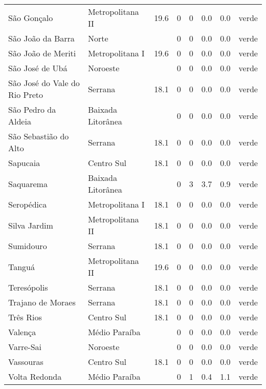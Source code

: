 \begin{longtable}{l|lllllll}
  São Gonçalo & Metropolitana II & 19.6 & 0 & 0 & 0.0 & 0.0 & verde \\ 
  São João da Barra & Norte &  & 0 & 0 & 0.0 & 0.0 & verde \\ 
  São João de Meriti & Metropolitana I & 19.6 & 0 & 0 & 0.0 & 0.0 & verde \\ 
  São José de Ubá & Noroeste &  & 0 & 0 & 0.0 & 0.0 & verde \\ 
  São José do Vale do Rio Preto & Serrana & 18.1 & 0 & 0 & 0.0 & 0.0 & verde \\ 
  São Pedro da Aldeia & Baixada Litorânea &  & 0 & 0 & 0.0 & 0.0 & verde \\ 
  São Sebastião do Alto & Serrana & 18.1 & 0 & 0 & 0.0 & 0.0 & verde \\ 
  Sapucaia & Centro Sul & 18.1 & 0 & 0 & 0.0 & 0.0 & verde \\ 
  Saquarema & Baixada Litorânea &  & 0 & 3 & 3.7 & 0.9 & verde \\ 
  Seropédica & Metropolitana I & 18.1 & 0 & 0 & 0.0 & 0.0 & verde \\ 
  Silva Jardim & Metropolitana II & 18.1 & 0 & 0 & 0.0 & 0.0 & verde \\ 
  Sumidouro & Serrana & 18.1 & 0 & 0 & 0.0 & 0.0 & verde \\ 
  Tanguá & Metropolitana II & 19.6 & 0 & 0 & 0.0 & 0.0 & verde \\ 
  Teresópolis & Serrana & 18.1 & 0 & 0 & 0.0 & 0.0 & verde \\ 
  Trajano de Moraes & Serrana & 18.1 & 0 & 0 & 0.0 & 0.0 & verde \\ 
  Três Rios & Centro Sul & 18.1 & 0 & 0 & 0.0 & 0.0 & verde \\ 
  Valença & Médio Paraíba &  & 0 & 0 & 0.0 & 0.0 & verde \\ 
  Varre-Sai & Noroeste &  & 0 & 0 & 0.0 & 0.0 & verde \\ 
  Vassouras & Centro Sul & 18.1 & 0 & 0 & 0.0 & 0.0 & verde \\ 
  Volta Redonda & Médio Paraíba &  & 0 & 1 & 0.4 & 1.1 & verde \\ 
  \hline
\end{longtable}
